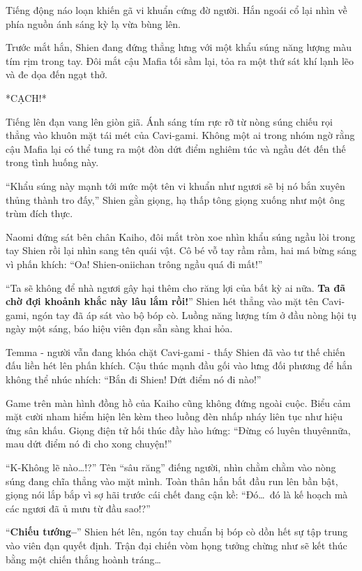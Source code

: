 \documentclass[../main.tex]{subfiles}
\begin{document}
Tiếng động náo loạn khiến gã vi khuẩn cứng đờ người. Hắn ngoái cổ lại nhìn về phía nguồn ánh sáng kỳ lạ vừa bùng lên.

Trước mắt hắn, Shien đang đứng thẳng lưng với một khẩu súng năng lượng màu tím rịm trong tay. Đôi mắt cậu Mafia tối sầm lại, tỏa ra một thứ sát khí lạnh lẽo và đe dọa đến ngạt thở.

*CẠCH!*

Tiếng lên đạn vang lên giòn giã. Ánh sáng tím rực rỡ từ nòng súng chiếu rọi thẳng vào khuôn mặt tái mét của Cavi-gami. Không một ai trong nhóm ngờ rằng cậu Mafia lại có thể tung ra một đòn dứt điểm nghiêm túc và ngầu đét đến thế trong tình huống này.


``Khẩu súng này mạnh tới mức một tên vi khuẩn như ngươi sẽ bị nó bắn xuyên thủng thành tro đấy,'' Shien gằn giọng, hạ thấp tông giọng xuống như một ông trùm đích thực.

Naomi đứng sát bên chân Kaiho, đôi mắt tròn xoe nhìn khẩu súng ngầu lòi trong tay Shien rồi lại nhìn sang tên quái vật. Cô bé vỗ tay rầm rầm, hai má bừng sáng vì phấn khích: ``Oa! Shien-oniichan trông ngầu quá đi mất!''

``Ta sẽ không để nhà ngươi gây hại thêm cho răng lợi của bất kỳ ai nữa. \textbf{Ta đã chờ đợi khoảnh khắc này lâu lắm rồi!}'' Shien hét thẳng vào mặt tên Cavi-gami, ngón tay đã áp sát vào bộ bóp cò. Luồng năng lượng tím ở đầu nòng hội tụ ngày một sáng, báo hiệu viên đạn sẵn sàng khai hỏa.

Temma - người vẫn đang khóa chặt Cavi-gami - thấy Shien đã vào tư thế chiến đấu liền hét lên phấn khích. Cậu thúc mạnh đầu gối vào lưng đối phương để hắn không thể nhúc nhích: ``Bắn đi Shien! Dứt điểm nó đi nào!''

Game trên màn hình đồng hồ của Kaiho cũng không đứng ngoài cuộc. Biểu cảm mặt cười nham hiểm hiện lên kèm theo luồng đèn nhấp nháy liên tục như hiệu ứng sân khấu. Giọng điện tử hối thúc đầy hào hứng: ``Đừng có luyên thuyênnữa, mau dứt điểm nó đi cho xong chuyện!''

``K-Không lẽ nào\dots!?'' Tên ``sâu răng'' điếng người, nhìn chằm chằm vào nòng súng đang chĩa thẳng vào mặt mình. Toàn thân hắn bắt đầu run lên bần bật, giọng nói lắp bắp vì sợ hãi trước cái chết đang cận kề: ``Đó\dots\ đó là kế hoạch mà các ngươi đã ủ mưu từ đầu sao!?''

``\textbf{Chiếu tướng--}'' Shien hét lên, ngón tay chuẩn bị bóp cò dồn hết sự tập trung vào viên đạn quyết định. Trận đại chiến vòm họng tưởng chừng như sẽ kết thúc bằng một chiến thắng hoành tráng\dots
\end{document}
